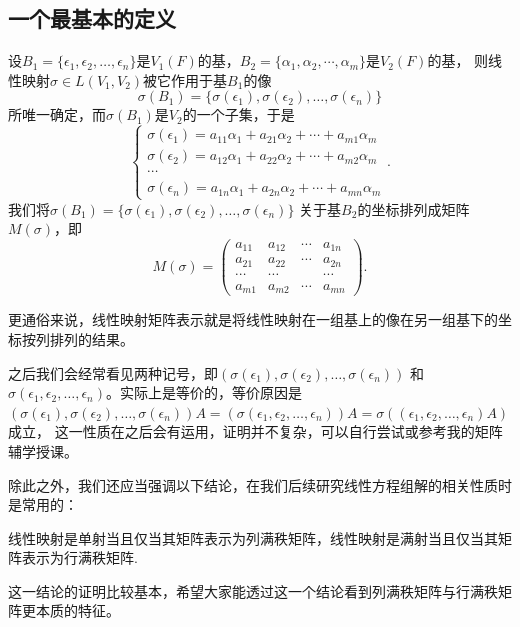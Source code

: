 \subsection{一个最基本的定义}
\begin{definition}
	设$B_1=\{\epsilon_1,\epsilon_2,\dots,\epsilon_n\}$是$V_1(F)$的基，$B_2=\{\alpha_1,\alpha_2,\cdots,\alpha_m\}$是$V_2(F)$的基，
	则线性映射$\sigma \in L(V_1,V_2)$被它作用于基$B_1$的像
	$$\sigma(B_1)=\{\sigma(\epsilon_1),\sigma(\epsilon_2),\dots,\sigma(\epsilon_n)\}$$
	所唯一确定，而$\sigma(B_1)$是$V_2$的一个子集，于是
	$$\begin{cases}
		\sigma(\epsilon_1)=a_{11}\alpha_1+a_{21}\alpha_2+\cdots+a_{m1}\alpha_m \\
		\sigma(\epsilon_2)=a_{12}\alpha_1+a_{22}\alpha_2+\cdots+a_{m2}\alpha_m \\
		\cdots \\
		\sigma(\epsilon_n)=a_{1n}\alpha_1+a_{2n}\alpha_2+\cdots+a_{mn}\alpha_m
	\end{cases}.$$
	我们将$\sigma(B_1)=\{\sigma(\epsilon_1),\sigma(\epsilon_2),\dots,\sigma(\epsilon_n)\}$
	关于基$B_2$的坐标排列成矩阵$M(\sigma)$，即
	$$M(\sigma)=\begin{pmatrix}
		a_{11} & a_{12} & \cdots & a_{1n} \\
		a_{21} & a_{22} & \cdots & a_{2n} \\
		\cdots & \cdots &        & \cdots \\
		a_{m1} & a_{m2} & \cdots & a_{mn}
	\end{pmatrix}.$$
\end{definition}
更通俗来说，线性映射矩阵表示就是将线性映射在一组基上的像在另一组基下的坐标按列排列的结果。

之后我们会经常看见两种记号，即$(\sigma(\epsilon_1),\sigma(\epsilon_2),\dots,\sigma(\epsilon_n))$ 
和$\sigma(\epsilon_1,\epsilon_2,\dots,\epsilon_n)$。实际上是等价的，等价原因是
$(\sigma(\epsilon_1),\sigma(\epsilon_2),\dots,\sigma(\epsilon_n))A=(\sigma(\epsilon_1,\epsilon_2,\dots,\epsilon_n))A=\sigma((\epsilon_1,\epsilon_2,\dots,\epsilon_n)A)$成立，
这一性质在之后会有运用，证明并不复杂，可以自行尝试或参考我的矩阵辅学授课。

除此之外，我们还应当强调以下结论，在我们后续研究线性方程组解的相关性质时是常用的：
\begin{theorem}
	线性映射是单射当且仅当其矩阵表示为列满秩矩阵，线性映射是满射当且仅当其矩阵表示为行满秩矩阵.
\end{theorem}
这一结论的证明比较基本，希望大家能透过这一个结论看到列满秩矩阵与行满秩矩阵更本质的特征。
